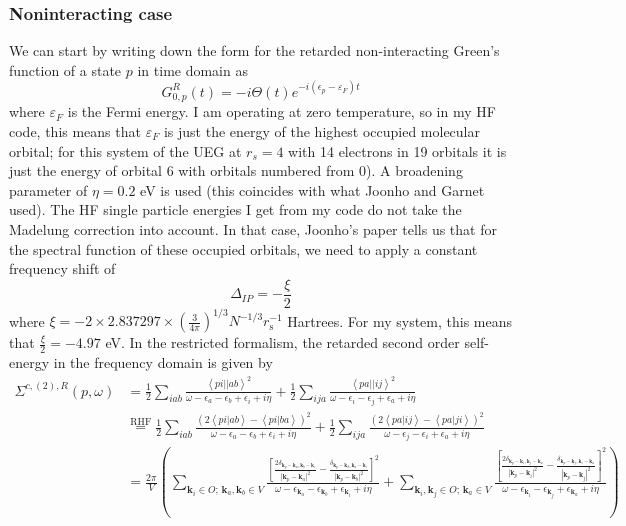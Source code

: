 \subsubsection{Noninteracting case}
We can start by writing down the form for the retarded non-interacting Green's function of a state $p$ in time domain as
\begin{equation}
    G^R_{0,p}(t) = -i \Theta(t) e^{-i \left(\epsilon_p - \varepsilon_F \right)t}
\end{equation}
where $\varepsilon_F$ is the Fermi energy. I am operating at zero temperature, so in my HF code, this means that $\varepsilon_F$ is just the energy of the highest occupied molecular orbital; for this system of the UEG at $r_s = 4$ with 14 electrons in 19 orbitals it is just the energy of orbital 6 with orbitals numbered from 0). A broadening parameter of $\eta = 0.2$ eV is used (this coincides with what Joonho and Garnet used). The HF single particle energies I get from my code do not take the Madelung correction into account. In that case, Joonho's paper tells us that for the spectral function of these occupied orbitals, we need to apply a constant frequency shift of
\begin{equation}
\Delta _{IP} = -\frac{\xi}{2}    
\end{equation}
where $\xi=-2 \times 2.837297 \times\left(\frac{3}{4 \pi}\right)^{1 / 3} N^{-1 / 3} r_{\mathrm{s}}^{-1}$ Hartrees. For my system, this means that $\frac{\xi}{2} = -4.97$ eV. In the restricted formalism, the retarded second order self-energy in the frequency domain is given by
\begin{align}
{\Sigma}^{c,(2),R}(p, \omega) &= \frac{1}{2} \sum_{iab} \frac{\left< pi \left| \right| ab \right>^2}{\omega - \epsilon_{a} - \epsilon_{b} + \epsilon_{i} + i \eta} + \frac{1}{2} \sum_{ija} \frac{\left< pa \left| \right| ij \right>^2}{\omega - \epsilon_{i} - \epsilon_{j} + \epsilon_{a} + i \eta}\\
&\overset{\text{RHF}}{=} \frac{1}{2} \sum_{iab} \frac{\left( 2\left<pi|ab\right> - \left<pi|ba\right>\right)^2}{\omega - \epsilon_{a} - \epsilon_{b} + \epsilon_{i} + i \eta} + \frac{1}{2} \sum_{ija} \frac{\left( 2\left<pa|ij\right> - \left<pa|ji\right>\right)^2}{\omega - \epsilon_{j} - \epsilon_{i} + \epsilon_{a} + i \eta}\\
& = \frac{2\pi}{V} \left( \sum_{\mathbf{k}_i \in O; \,\mathbf{k}_a , \mathbf{k}_b \in V} \frac{\left[ \frac{2\delta_{\mathbf{k}_p - \mathbf{k}_a , \mathbf{k}_b - \mathbf{k}_i}}{|\mathbf{k}_p - \mathbf{k}_a|^2} - \frac{\delta_{\mathbf{k}_p - \mathbf{k}_b , \mathbf{k}_a - \mathbf{k}_i}}{|\mathbf{k}_p - \mathbf{k}_b|^2} \right]^2 }{\omega - \epsilon_{\mathbf{k}_a} - \epsilon_{\mathbf{k}_b} + \epsilon_{\mathbf{k}_i} + i \eta}  + \sum_{\mathbf{k}_i,\mathbf{k}_j \in O;\, \mathbf{k}_a \in V} \frac{\left[ \frac{2\delta_{\mathbf{k}_p - \mathbf{k}_i , \mathbf{k}_j - \mathbf{k}_a}}{|\mathbf{k}_p-\mathbf{k}_i|^2} - \frac{\delta_{\mathbf{k}_p - \mathbf{k}_j , \mathbf{k}_i - \mathbf{k}_a}}{|\mathbf{k}_p - \mathbf{k}_j|^2} \right]^2 }{\omega - \epsilon_{\mathbf{k}_i} - \epsilon_{\mathbf{k}_j} + \epsilon_{\mathbf{k}_a} + i \eta} \right)
\label{eq:self_energy_2nd_order}
\end{align}
